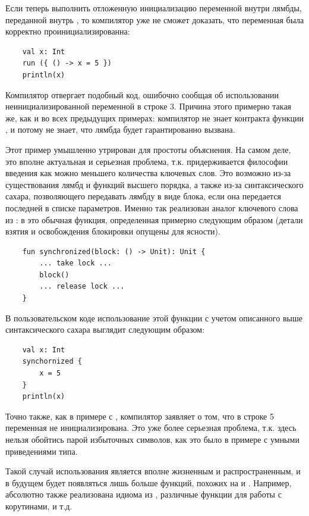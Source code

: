 Если теперь выполнить отложенную инициализацию переменной внутри лямбды, переданной внутрь , то компилятор уже не сможет доказать, что переменная была корректно проинициализированна:

\begin{verbatim}
    val x: Int
    run ({ () -> x = 5 })
    println(x)
\end{verbatim}

Компилятор отвергает подобный код, ошибочно сообщая об использовании неинициализированной переменной в строке 3. Причина этого примерно такая же, как и во всех предыдущих примерах: компилятор не знает контракта функции , и потому не знает, что лямбда  будет гарантированно вызвана.

Этот пример умышленно утрирован для простоты объяснения. На самом деле, это вполне актуальная и серьезная проблема, т.к.  придерживается философии введения как можно меньшего количества ключевых слов. Это возможно из-за существования лямбд и функций высшего порядка, а также из-за синтаксического сахара, позволяющего передавать лямбду в виде блока, если она передается последней в списке параметров. Именно так реализован аналог ключевого слова  из : в  это обычная функция, определенная примерно следующим образом (детали взятия и освобождения блокировки опущены для ясности).

\begin{verbatim}
    fun synchronized(block: () -> Unit): Unit {
        ... take lock ...
        block()
        ... release lock ...
    }
\end{verbatim}

В пользовательском коде использование этой функции с учетом описанного выше синтаксического сахара выглядит следующим образом:

\begin{verbatim}
    val x: Int
    synchornized {
        x = 5
    }
    println(x)
\end{verbatim}

Точно также, как в примере с , компилятор заявляет о том, что в строке 5 переменная  не инициализирована. Это уже более серьезная проблема, т.к. здесь нельзя обойтись парой избыточных символов, как это было в примере с умными приведениями типа. 

Такой случай использования является вполне жизненным и распространенным, и в будущем будет появляться лишь больше функций, похожих на  и . Например, абсолютно также реализована идиома  из , различные функции для работы с корутинами, и т.д.

